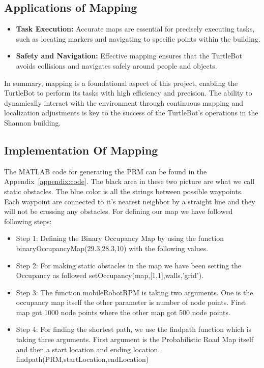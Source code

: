 \documentclass{article}
\begin{document}
	\subsection{Applications of Mapping}
	\begin{itemize}
		\item \textbf{Task Execution:} Accurate maps are essential for precisely executing tasks, such as locating markers and navigating to specific points within the building.
		\item \textbf{Safety and Navigation:} Effective mapping ensures that the TurtleBot avoids collisions and navigates safely around people and objects.
	\end{itemize}
	In summary, mapping is a foundational aspect of this project, enabling the TurtleBot to perform its tasks with high efficiency and precision. The ability to dynamically interact with the environment through continuous mapping and localization adjustments is key to the success of the TurtleBot's operations in the Shannon building.

	\subsection{Implementation Of Mapping}
	The MATLAB code for generating the PRM can be found in the Appendix~\ref{appendix:code}. The black area in these two picture are what we call static obstacles. The blue color is all the strings between possible waypoints. Each waypoint are connected to it's nearest neighbor by a straight line and they will not be crossing any obstacles. For defining our map we have followed following steps: 
	\begin{itemize}
		\item Step 1: Defining the Binary Occupancy Map by using the function binaryOccupancyMap(29.3,28.3,10) with the following values.
		\item Step 2: For making static obstacles in the map we have been setting the Occupancy as followed setOccupancy(map,[1,1],walls,'grid'). 
		\item Step 3: The function mobileRobotRPM is taking two arguments. One is the occupancy map itself the other parameter is number of node points. First map got 1000 node points where the other map got 500 node points.
		\item Step 4: For finding the shortest path, we use the findpath function which is taking three arguments. First argument is the Probabilistic Road Map itself and then a start location and ending location.  findpath(PRM,startLocation,endLocation)
	\end{itemize}
	
\end{document}

